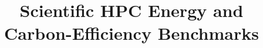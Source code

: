 \documentclass[conference]{IEEEtran}
\begin{document}
\title{Scientific HPC Energy and Carbon-Efficiency Benchmarks}

\author{}

\maketitle








\end{document}
